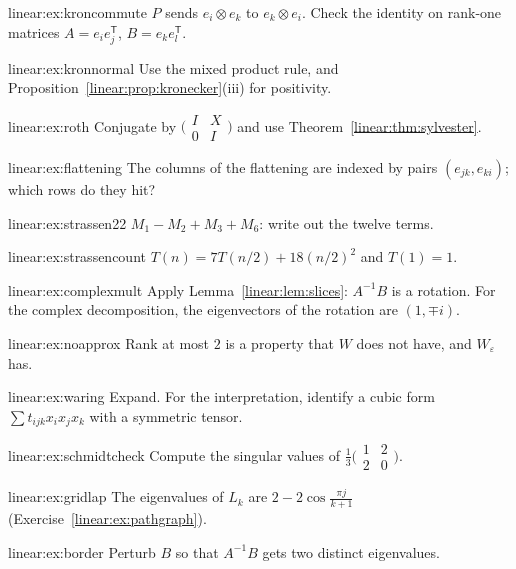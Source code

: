 \begin{hint}{linear:ex:kroncommute}
$P$ sends $e_i\otimes e_k$ to $e_k\otimes e_i$. Check the identity on rank-one matrices $A=e_ie_j^{\mathsf T}$, $B=e_ke_l^{\mathsf T}$.
\end{hint}
\begin{hint}{linear:ex:kronnormal}
Use the mixed product rule, and Proposition~\ref{linear:prop:kronecker}(iii) for positivity.
\end{hint}
\begin{hint}{linear:ex:roth}
Conjugate by $\bigl(\begin{smallmatrix}I&X\\0&I\end{smallmatrix}\bigr)$ and use Theorem~\ref{linear:thm:sylvester}.
\end{hint}
\begin{hint}{linear:ex:flattening}
The columns of the flattening are indexed by pairs $(e_{jk},e_{ki})$; which rows do they hit?
\end{hint}
\begin{hint}{linear:ex:strassen22}
$M_1-M_2+M_3+M_6$: write out the twelve terms.
\end{hint}
\begin{hint}{linear:ex:strassencount}
$T(n)=7T(n/2)+18(n/2)^2$ and $T(1)=1$.
\end{hint}
\begin{hint}{linear:ex:complexmult}
Apply Lemma~\ref{linear:lem:slices}: $A^{-1}B$ is a rotation. For the complex decomposition, the eigenvectors of the rotation are $(1,\mp i)$.
\end{hint}
\begin{hint}{linear:ex:noapprox}
Rank at most $2$ is a property that $W$ does not have, and $W_\varepsilon$ has.
\end{hint}
\begin{hint}{linear:ex:waring}
Expand. For the interpretation, identify a cubic form $\sum t_{ijk}x_ix_jx_k$ with a symmetric tensor.
\end{hint}
\begin{hint}{linear:ex:schmidtcheck}
Compute the singular values of $\frac13\bigl(\begin{smallmatrix}1&2\\2&0\end{smallmatrix}\bigr)$.
\end{hint}
\begin{hint}{linear:ex:gridlap}
The eigenvalues of $L_k$ are $2-2\cos\frac{\pi j}{k+1}$ (Exercise~\ref{linear:ex:pathgraph}).
\end{hint}
\begin{hint}{linear:ex:border}
Perturb $B$ so that $A^{-1}B$ gets two distinct eigenvalues.
\end{hint}

